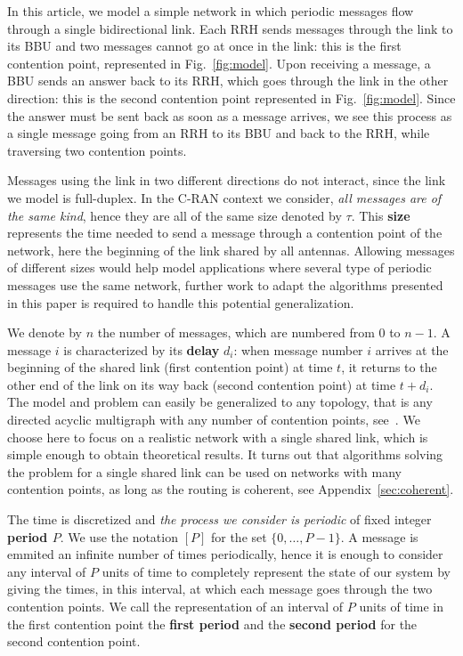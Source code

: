 \documentclass[a4paper,UKenglish,cleveref, autoref, thm-restate]{lipics-v2019}
\begin{document}
In this article, we model a simple network in which periodic messages flow through a single bidirectional link. Each RRH sends messages through the link to its
BBU and two messages cannot go at once in the link: this is the first contention point, represented in Fig.~\ref{fig:model}. Upon receiving a message, a BBU sends an answer back to its RRH, which goes through the link in the other direction: this is the second contention point represented in Fig.~\ref{fig:model}. Since the answer must be sent back as soon as a message arrives, we see this process as a single message going from an RRH to its BBU and back to the RRH, while traversing two contention points. 

Messages using the link in two different directions do not interact, since the link we model is full-duplex. In the C-RAN context we consider, \emph{all messages are of the same kind}, hence they are all of the same size denoted by $\tau$. This \textbf{size} represents the time needed to send a message through a contention point of the network, here the beginning of the link shared by all antennas. Allowing messages of different sizes would help model applications where several type of periodic messages use the same network, further work to adapt the algorithms presented in this paper is required to handle this potential generalization.


 We denote by $n$ the number of messages, which are numbered from $0$ to $n-1$. A message $i$ is characterized by its \textbf{delay} $d_i$: when message number $i$ arrives at the beginning of the shared link (first contention point) at time $t$, it returns to the other end of the link on its way back (second contention point) at time $t + d_i$. The model and problem can easily be generalized to any topology, that is any directed acyclic multigraph with any number of contention points, see~\cite{dominique2018deterministic}. We choose here to focus on a realistic network with a single shared link, which is simple enough to obtain theoretical results. It turns out that algorithms solving the problem for a single shared link can be used on networks with many contention points, as long as the routing is coherent, see Appendix~\ref{sec:coherent}. 

The time is discretized and \emph{the process we consider is periodic} of fixed integer \textbf{period $P$}. We use the notation $[P]$ for the set $\{0,\dots,P-1\}$. A message is emmited an infinite number of times periodically, hence it is enough to consider any interval of $P$ units of time to completely represent the state of our system by giving the times, in this interval, at which each message goes through the two contention points. We call the representation of an interval of $P$ units of time in the first contention point the \textbf{first period} and the \textbf{second period} for the second contention point. 
\end{document}
